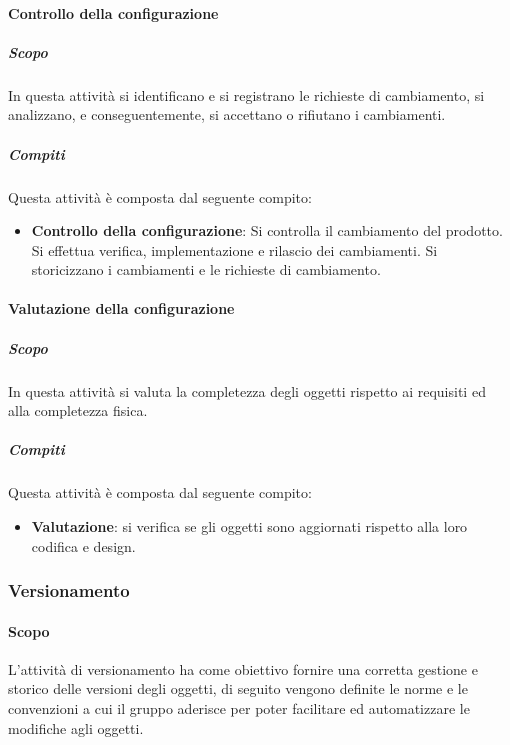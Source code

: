 \paragraph{Controllo della configurazione}
\label{par:controllo_della_configurazione}
\subparagraph{Scopo}
\label{par:controllo_della_configurazione:scopo}
In questa attività si identificano e si registrano le richieste di cambiamento, si analizzano, e conseguentemente, si accettano o rifiutano i cambiamenti.
\subparagraph{Compiti}
\label{par:controllo_della_configurazione:compiti}
Questa attività è composta dal seguente compito:
\begin{itemize}
    \item \textbf{Controllo della configurazione}: Si controlla il cambiamento del prodotto. Si effettua verifica, implementazione e rilascio dei cambiamenti. Si storicizzano i cambiamenti e le richieste di cambiamento.
\end{itemize}

\paragraph{Valutazione della configurazione}
\label{par:valutazione_della_configurazione}
\subparagraph{Scopo}
\label{par:valutazione_della_configurazione:scopo}
In questa attività si valuta la completezza degli oggetti rispetto ai requisiti ed alla completezza fisica.
\subparagraph{Compiti}
\label{par:valutazione_della_configurazione:compiti}
Questa attività è composta dal seguente compito:
\begin{itemize}
    \item \textbf{Valutazione}: si verifica se gli oggetti sono aggiornati rispetto alla loro codifica e design.
\end{itemize}


\subsubsection{Versionamento}
\label{ssub:gestione_configurazione:versionamento}

\paragraph{Scopo}

L'attività di versionamento ha come obiettivo fornire una corretta gestione e storico delle versioni degli oggetti, di seguito vengono
definite le norme e le convenzioni a cui il gruppo aderisce per poter facilitare ed automatizzare le modifiche agli oggetti.

